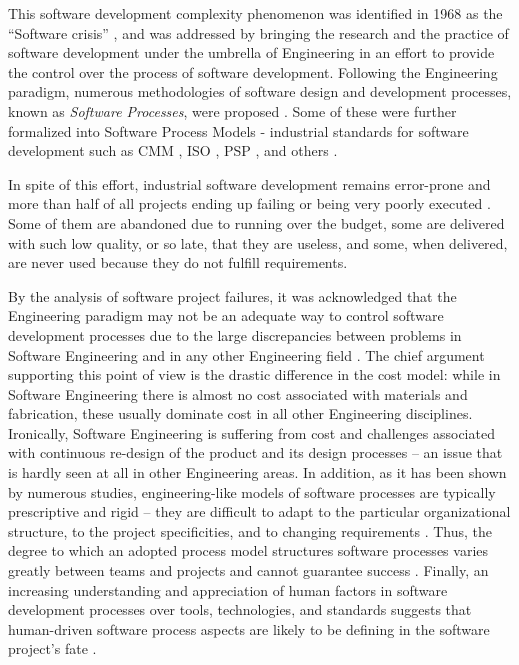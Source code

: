 This software development complexity phenomenon was identified in 1968 as the ``Software crisis'' 
\cite{naur_crisis_68}, and was addressed by bringing the research and the practice of software 
development under the umbrella of Engineering in an effort to provide the control over the process 
of software development. 
Following the Engineering paradigm, numerous methodologies of software design and development 
processes, known as \textit{Software Processes}, were proposed \cite{citeulike:10002165}.
Some of these were further formalized into Software Process Models - industrial standards for software 
development such as CMM \cite{citeulike:9962021}, ISO \cite{iso-standard}, 
PSP \cite{citeulike:8347315}, and others \cite{citeulike:5043104}. 

In spite of this effort, industrial software development remains error-prone and more than half of all 
projects ending up failing or being very poorly executed \cite{chaos2006}.
Some of them are abandoned due to running over the budget, some are delivered with such low quality, 
or so late, that they are useless, and some, when delivered, are never used because they do not 
fulfill requirements. 

By the analysis of software project failures, it was acknowledged that the Engineering paradigm 
may not be an adequate way to control software development processes due to the large discrepancies 
between problems in Software Engineering and in any other Engineering field 
\cite{citeulike:3729379} \cite{citeulike:5203446} \cite{citeulike:2207657} \cite{citeulike:12550665}.
The chief argument supporting this point of view is the drastic difference in the cost model:
while in Software Engineering there is almost no cost associated with materials and fabrication, 
these usually dominate cost in all other Engineering disciplines. 
Ironically, Software Engineering is suffering from cost and challenges associated with 
continuous re-design of the product and its design processes -- an issue that is 
hardly seen at all in other Engineering areas. 
In addition, as it has been shown by numerous studies, engineering-like models of software processes 
are typically prescriptive and rigid -- they are difficult to adapt to the particular organizational 
structure, to the project specificities, and to changing requirements \cite{citeulike:113403}. 
Thus, the degree to which an adopted process model structures software processes varies greatly 
between teams and projects and cannot guarantee success \cite{sacchi_2001} \cite{citeulike:10567306}. 
Finally, an increasing understanding and appreciation of human factors in software development 
processes over tools, technologies, and standards suggests that human-driven software process aspects 
are likely to be defining in the software project's fate \cite{citeulike:6580825} 
\cite{citeulike:149387} \cite{1605185} \cite{citeulike:113403} \cite{citeulike:12743107}. 

